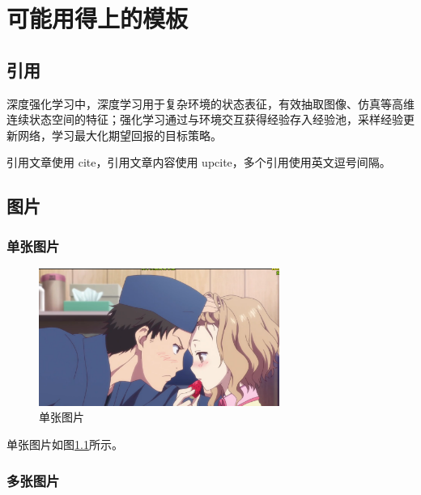\chapter{可能用得上的模板}
\label{introduction}

\section{引用}

深度强化学习\cite{Mnih2013PlayingAW,Ye2020MasteringCC}中，深度学习用于复杂环境的状态表征，有效抽取图像、仿真等高维连续状态空间的特征；强化学习通过与环境交互获得经验存入经验池，采样经验更新网络，学习最大化期望回报的目标策略。

引用文章使用 cite，引用文章内容使用 upcite，多个引用使用英文逗号间隔。

\section{图片}

\subsection{单张图片}

\begin{figure}
	\centering
	\includegraphics[width=0.7\textwidth]{img/ohana.png}
	\caption{\label{fig:one_fig}单张图片}
\end{figure}

单张图片如图\ref{fig:one_fig}所示。

\subsection{多张图片}


